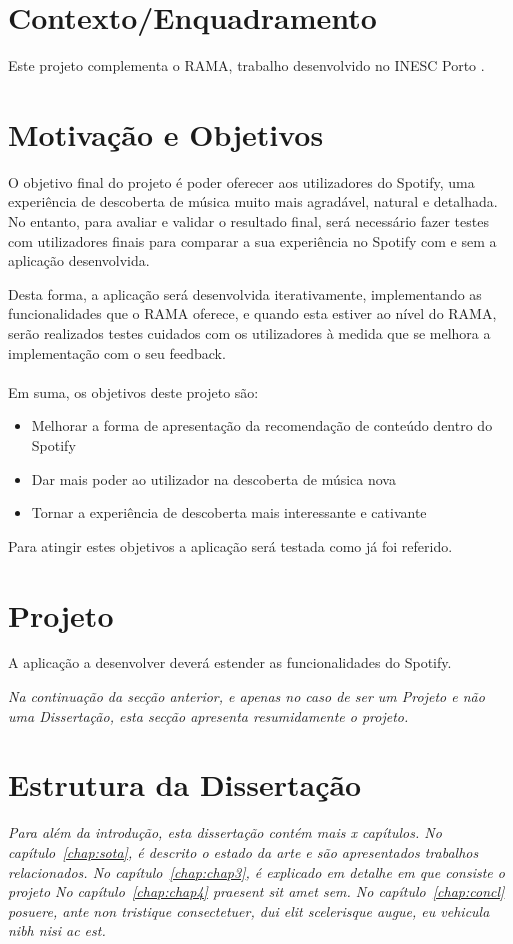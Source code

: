 \section{Contexto/Enquadramento} \label{sec:context}

Este projeto complementa o RAMA, trabalho desenvolvido no INESC Porto \cite{Costa2008} \cite{Sarmento2009} \cite{Costa2009} \cite{Gouyon2011}.

\section{Motivação e Objetivos} \label{sec:goals}

O objetivo final do projeto é poder oferecer aos utilizadores do Spotify, uma experiência de descoberta de música muito mais agradável, natural e detalhada.
No entanto, para avaliar e validar o resultado final, será necessário fazer testes com utilizadores finais para comparar a sua experiência no Spotify com e sem a aplicação desenvolvida.

Desta forma, a aplicação será desenvolvida iterativamente, implementando as funcionalidades que o RAMA oferece, e quando esta estiver ao nível do RAMA, serão realizados testes cuidados com os utilizadores à medida que se melhora a implementação com o seu feedback.
 \\
 \\
Em suma, os objetivos deste projeto são:

\begin{itemize}
  \item Melhorar a forma de apresentação da recomendação de conteúdo dentro do Spotify
  \item Dar mais poder ao utilizador na descoberta de música nova
  \item Tornar a experiência de descoberta mais interessante e cativante
\end{itemize}

Para atingir estes objetivos a aplicação será testada como já foi referido.

\section{Projeto} \label{sec:proj}

A aplicação a desenvolver deverá estender as funcionalidades do Spotify.

\emph{
Na continuação da secção anterior, e apenas no caso de ser um Projeto
e não uma Dissertação, esta secção apresenta resumidamente o projeto.}


\section{Estrutura da Dissertação} \label{sec:struct}

\emph{Para além da introdução, esta dissertação contém mais x capítulos.
No capítulo~\ref{chap:sota}, é descrito o estado da arte e são
apresentados trabalhos relacionados.
No capítulo~\ref{chap:chap3}, é explicado em detalhe em que consiste o projeto
No capítulo~\ref{chap:chap4} praesent sit amet sem. 
No capítulo~\ref{chap:concl}  posuere, ante non tristique
consectetuer, dui elit scelerisque augue, eu vehicula nibh nisi ac
est. 
}